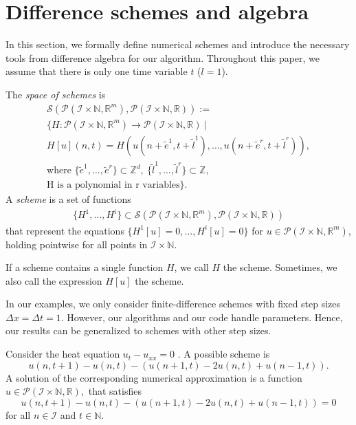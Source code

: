 \documentclass[runningheads]{llncs}
\newcommand{\Rr}{\mathbb{R}}
\newcommand{\Nn}{\mathbb{N}}
\newcommand{\Zz}{{\mathbb{Z}}}
\newcommand{\1}{\chi}
\newcommand{\Ii}{\mathcal{I}}
\begin{document}
\section{Difference schemes and algebra}
\label{algodetec}
In this section, we formally define numerical schemes and introduce the necessary tools from difference algebra for our algorithm.
Throughout this paper, we assume that there is only one time variable $t$ ($l=1$).
\begin{definition}
	The \emph{space of schemes} is
	\begin{gather*}
		\mathcal{S}(\mathcal{P}(\Ii\times\Nn,\Rr^m),\mathcal{P}(\Ii\times\Nn,\Rr)):=\\
		\Bigg\{H:\mathcal{P}(\Ii\times\Nn,\Rr^m)\rightarrow\mathcal{P}(\Ii\times\Nn,\Rr)\ \Bigg|\\
		H[u](n,t)=H(u(n+\tilde{e}^1,t+\tilde{l}^1),\ldots,u(n+\tilde{e}^r,t+\tilde{l}^r)),\\
		\text{where }
		\{\tilde{e}^1,\ldots,\tilde{e}^r\}\subset\Zz^d,\ \{\tilde{l}^1,\ldots,\tilde{l}^r\}\subset\Zz,\\
		\text{H is a polynomial in r variables}
		\Bigg\}.
	\end{gather*}
	A \emph{scheme} is a set of functions
	\begin{gather*}
		\{H^1,\ldots,H^i\}\subset\mathcal{S}(\mathcal{P}(\Ii\times\Nn,\Rr^m),\mathcal{P}(\Ii\times\Nn,\Rr))
	\end{gather*}
	that represent the equations $\{H^1[u]=0,\ldots,H^i[u]=0\}$ for $u\in\mathcal{P}(\Ii\times\Nn,\Rr^m)$, holding pointwise for all points in $\Ii\times\Nn$.
\end{definition}
If a scheme contains a single function $H$, we call $H$ the scheme. Sometimes, we also call the expression $H[u]$ the scheme.
\begin{remark}
	In our examples, we only consider finite-difference schemes with fixed step sizes $\Delta x=\Delta t=1$. However, our algorithms and our code handle parameters. Hence, our results can be generalized to schemes with other step sizes.
\end{remark}
\begin{example}
	\label{ee}
Consider the heat equation	$u_t-u_{xx}=0$ \cite{smoller94}.  A possible scheme is
\[	
		u(n,t+1)-u(n,t)-(u(n+1,t)-2u(n,t)+u(n-1,t)).
\]
A solution of the corresponding numerical approximation is a function $u\in \mathcal{P}(\Ii\times\Nn,\Rr),$ that satisfies
\[
		u(n,t+1)-u(n,t)-(u(n+1,t)-2u(n,t)+u(n-1,t))=0
\]
for all $n\in \Ii$ and $t\in \Nn$. 
\end{example}
\end{document}
